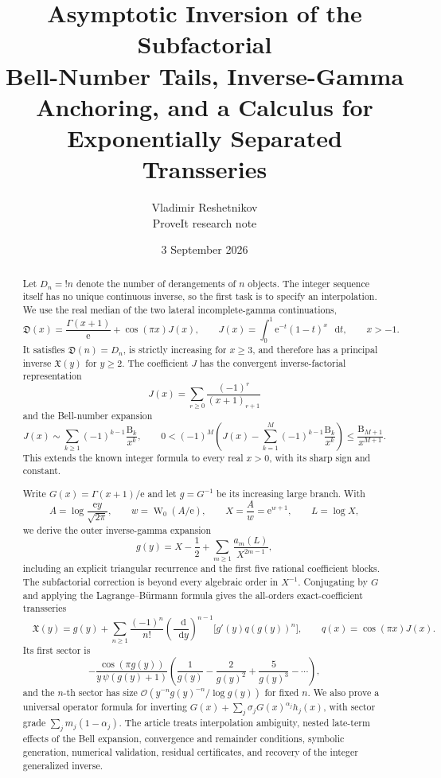 \documentclass[11pt,oneside]{article}
\theoremstyle{plain}
\theoremstyle{definition}
\theoremstyle{remark}
\newcommand{\ee}{\mathrm{e}}
\newcommand{\dd}{\mathop{}\!\mathrm{d}}
\newcommand{\W}{\operatorname{W}}
\newcommand{\Dfrak}{\mathfrak{D}}
\newcommand{\Xfrak}{\mathfrak{X}}
\newcommand{\Bell}{\mathrm{B}}
\newcommand{\bigO}{\mathcal{O}}
\begin{document}
\title{\textbf{Asymptotic Inversion of the Subfactorial}\\[0.35em]
  \Large Bell-Number Tails, Inverse-Gamma Anchoring, and a Calculus for Exponentially Separated Transseries}
\author{Vladimir Reshetnikov\\
  \small ProveIt research note}
\date{3 September 2026}
\maketitle

\begin{abstract}
Let \(D_n={!n}\) denote the number of derangements of \(n\) objects.  The
integer sequence itself has no unique continuous inverse, so the first task is
to specify an interpolation.  We use the real median of the two lateral
incomplete-gamma continuations,
\[
 \Dfrak(x)=\frac{\Gamma(x+1)}{\ee}+\cos(\pi x)J(x),
 \qquad
 J(x)=\int_0^1 \ee^{-t}(1-t)^x\,\dd t,
 \qquad x>-1.
\]
It satisfies \(\Dfrak(n)=D_n\), is strictly increasing for \(x\ge3\), and
therefore has a principal inverse \(\Xfrak(y)\) for \(y\ge2\).  The coefficient
\(J\) has the convergent inverse-factorial representation
\[
 J(x)=\sum_{r\ge0}\frac{(-1)^r}{(x+1)_{r+1}}
\]
and the Bell-number expansion
\[
 J(x)\sim\sum_{k\ge1}(-1)^{k-1}\frac{\Bell_k}{x^k},
 \qquad
 0<(-1)^M\!\left(J(x)-\sum_{k=1}^M(-1)^{k-1}\frac{\Bell_k}{x^k}\right)
 \le \frac{\Bell_{M+1}}{x^{M+1}}.
\]
This extends the known integer formula to every real \(x>0\), with its sharp
sign and constant.

Write \(G(x)=\Gamma(x+1)/\ee\) and let \(g=G^{-1}\) be its increasing large
branch.  With
\[
 A=\log\!\frac{\ee y}{\sqrt{2\pi}},\qquad
 w=\W_0(A/\ee),\qquad X=\frac{A}{w}=\ee^{w+1},\qquad L=\log X,
\]
we derive the outer inverse-gamma expansion
\[
 g(y)=X-\frac12+\sum_{m\ge1}\frac{a_m(L)}{X^{2m-1}},
\]
including an explicit triangular recurrence and the first five rational
coefficient blocks.  The subfactorial correction is beyond every algebraic
order in \(X^{-1}\).  Conjugating by \(G\) and applying the
Lagrange--B\"urmann formula gives the all-orders exact-coefficient transseries
\[
 \boxed{\quad
 \Xfrak(y)=g(y)+\sum_{n\ge1}\frac{(-1)^n}{n!}
 \left(\frac{\dd}{\dd y}\right)^{n-1}
 \bigl[g'(y)q(g(y))^n\bigr],\qquad q(x)=\cos(\pi x)J(x).
 \quad}
\]
Its first sector is
\[
 -\frac{\cos(\pi g(y))}{y\,\psi(g(y)+1)}
 \left(\frac1{g(y)}-\frac2{g(y)^2}+\frac5{g(y)^3}-\cdots\right),
\]
and the \(n\)-th sector has size
\(\bigO(y^{-n}g(y)^{-n}/\log g(y))\) for fixed \(n\).  We also prove a
universal operator formula for inverting
\(G(x)+\sum_j\sigma_jG(x)^{\alpha_j}h_j(x)\), with sector grade
\(\sum_jm_j(1-\alpha_j)\).  The article treats interpolation ambiguity,
nested late-term effects of the Bell expansion, convergence and remainder
conditions, symbolic generation, numerical validation, residual certificates,
and recovery of the integer generalized inverse.
\end{abstract}
\end{document}
